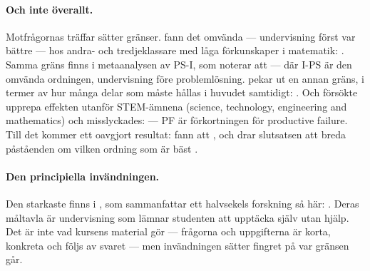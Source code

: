 \paragraph{Och inte överallt.}  Motfrågornas träffar sätter gränser.
\textcite{Fyfe2014} fann det omvända --- undervisning först var bättre ---
hos andra- och tredjeklassare med låga förkunskaper i matematik:
.
Samma gräns finns i metaanalysen av PS-I, som noterar att
--- där I-PS är den omvända ordningen, undervisning före problemlösning.
\textcite{Ashman2020} pekar ut en annan gräns, i termer av hur många delar
som måste hållas i huvudet samtidigt:
.  Och
\textcite{Nachtigall2020} försökte upprepa effekten utanför
STEM-ämnena (\foreignlanguage{english}{science, technology, engineering and
mathematics}) och misslyckades:
 --- PF är förkortningen för
\foreignlanguage{english}{productive failure}.  Till det kommer ett
oavgjort resultat:
\textcite{ChaseKlahr2017} fann att
, och drar slutsatsen att breda påståenden om vilken ordning som är
bäst .

\paragraph{Den principiella invändningen.}  Den starkaste finns i
\textcite{KirschnerSwellerClark2006}, som sammanfattar ett halvsekels
forskning så här:
.  Deras måltavla är
undervisning som lämnar studenten att upptäcka själv utan hjälp.  Det är
inte vad kursens material gör --- frågorna och uppgifterna är korta,
konkreta och följs av svaret --- men invändningen sätter fingret på var
gränsen går.

